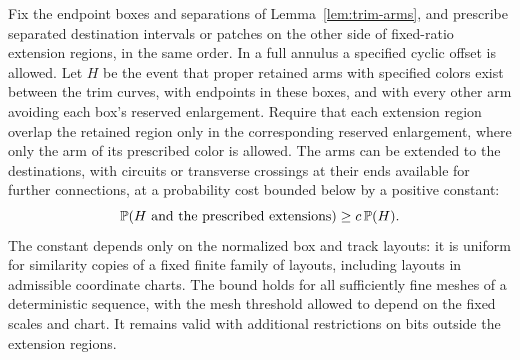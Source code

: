\begin{lemma}\label{lem:local-guarded-extension}
Fix the endpoint boxes and separations of
Lemma~\ref{lem:trim-arms}, and prescribe separated destination
intervals or patches on the other side of fixed-ratio extension
regions, in the same order.  In a full annulus a specified cyclic
offset is allowed.  Let $H$ be the event that proper retained
arms with specified colors exist between the trim curves, with
endpoints in these boxes, and with every other arm avoiding each
box's reserved enlargement.  Require that each extension region
overlap the retained region only in the corresponding reserved
enlargement, where only the arm of its prescribed color is allowed.
The arms can be extended to the destinations,
with circuits or transverse crossings at their ends available
for further connections, at a probability cost bounded below
by a positive constant:
\begin{equation}\label{eq:local-extension}
 \mathbb P(H\text{ and the prescribed extensions})\ge c\,\mathbb P(H).
\end{equation}
The constant depends only on the normalized box and track layouts:
it is uniform for similarity copies of a fixed finite family of
layouts, including layouts in admissible coordinate charts.  The
bound holds for all sufficiently fine meshes of a deterministic
sequence, with the mesh threshold allowed to depend on the fixed
scales and chart.  It remains valid with additional restrictions
on bits outside the extension regions.
\end{lemma}

